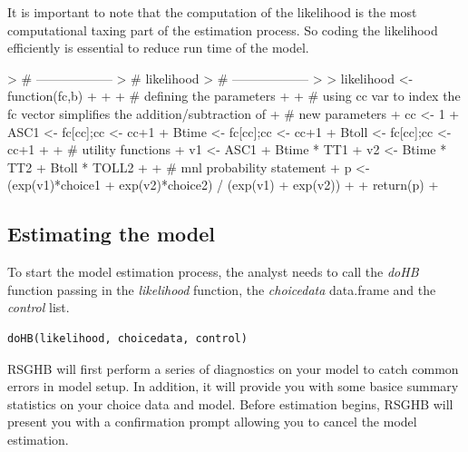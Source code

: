 \documentclass{article}
\begin{document}
It is important to note that the computation of the likelihood is the most computational taxing part of the estimation process. So coding the likelihood efficiently is essential to reduce run time of the model.


\begin{Schunk}
\begin{Sinput}
> # ------------------
> # likelihood
> # ------------------
> 
> likelihood <- function(fc,b)
+ {
+ 
+   # defining the parameters          
+ 
+   # using cc var to index the fc vector simplifies the addition/subtraction of 
+   # new parameters     
+   cc <- 1
+   ASC1   <- fc[cc];cc <- cc+1
+   Btime  <- fc[cc];cc <- cc+1
+   Btoll  <- fc[cc];cc <- cc+1  
+ 
+   # utility functions
+   v1 <- ASC1       + Btime * TT1                   
+   v2 <-              Btime * TT2 + Btoll * TOLL2   
+  
+   # mnl probability statement
+   p  <- (exp(v1)*choice1 + exp(v2)*choice2) / (exp(v1) + exp(v2))
+ 	
+   return(p)
+ }
\end{Sinput}
\end{Schunk}

\subsection*{Estimating the model}

To start the model estimation process, the analyst needs to call the \emph{doHB} function passing in the \emph{likelihood} function, the \emph{choicedata} data.frame and the \emph{control} list. 

\begin{verbatim}
doHB(likelihood, choicedata, control)
\end{verbatim}

RSGHB will first perform a series of diagnostics on your model to catch common errors in model setup. In addition, it will provide you with some basice summary statistics on your choice data and model. Before estimation begins, RSGHB will present you with a confirmation prompt allowing you to cancel the model estimation.
\end{document}
